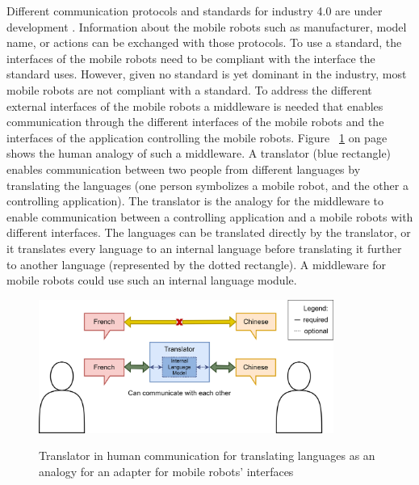 Different communication protocols and standards for industry 4.0 are under development \cite{sanneman_state_2020}. Information about the mobile robots such as manufacturer, model name, or actions can be exchanged with those protocols. To use a standard, the interfaces of the mobile robots need to be compliant with the interface the standard uses.  However, given no standard is yet dominant in the industry, most mobile robots are not compliant with a standard. To address the different external interfaces of the mobile robots a middleware is needed that enables communication through the different interfaces of the mobile robots and the interfaces of the application controlling the mobile robots.  Figure ~\ref{fig:introduction__humanstandardtranslator} on page ~\pageref{fig:introduction__humanstandardtranslator} shows the human analogy of such a middleware. A translator (blue rectangle) enables  communication between two people from different languages by translating the languages (one person symbolizes a mobile robot, and the other a controlling application). The translator is the analogy for the middleware to enable communication between a controlling application and a mobile robots with different interfaces. The languages can be translated directly by the translator, or it translates every language to an internal language before translating it further to another language (represented by the dotted rectangle). A middleware for mobile robots could use such an internal language module.

\begin{figure}[!ht]
	\centering
	\includegraphics[width=0.86\textwidth]{images/CommunicationStandardTranslator.png}\\
	\caption[Compact Routing Example]%
          {Translator in human communication for translating languages as an analogy for an adapter for mobile robots' interfaces}
	\label{fig:introduction__humanstandardtranslator}
\end{figure}

\newpage

